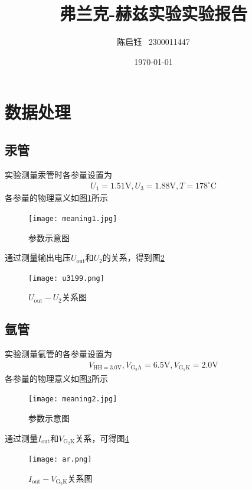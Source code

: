 \documentclass{ctexart}
\title{弗兰克-赫兹实验实验报告}
\author{陈启钰\,\,\, 2300011447}
\date{\today}
\begin{document}
	\maketitle
	\section{数据处理}
	\subsection{汞管}
	实验测量汞管时各参量设置为
	\begin{align}
		U_1=1.51\mathrm{V},U_3=1.88\mathrm{V},T=178^\circ\mathrm{C}
	\end{align}
	各参量的物理意义如图\ref{meaning1}所示
	\begin{figure}[H]
		\centering
		\texttt{[image: meaning1.jpg]}
		\caption{参数示意图}
		\label{meaning1}
	\end{figure}
	通过测量输出电压$U_{\mathrm{out}}$和$U_2$的关系，得到图\ref{u3199}
	\begin{figure}[H]
		\centering
		\texttt{[image: u3199.png]}
		\caption{$U_{\mathrm{out}}-U_2$关系图}
		\label{u3199}
	\end{figure}
	\subsection{氩管}
	实验测量氩管的各参量设置为
	\begin{align}
		V_{\mathrm{HH}=3.0\mathrm{V}},V_{\mathrm{G_2A}}=6.5\mathrm{V},V_{\mathrm{G_1K}}=2.0\mathrm{V}
	\end{align}
	各参量的物理意义如图\ref{meaning2}所示
	\begin{figure}[H]
		\centering
		\texttt{[image: meaning2.jpg]}
		\caption{参数示意图}
		\label{meaning2}
	\end{figure}
	通过测量$I_{\mathrm{out}}$和$V_{\mathrm{G_2K}}$关系，可得图\ref{ar}
	\begin{figure}[H]
		\centering
		\texttt{[image: ar.png]}
		\caption{$I_{\mathrm{out}}-V_{\mathrm{G_2K}}$关系图}
		\label{ar}
	\end{figure}
\end{document}
